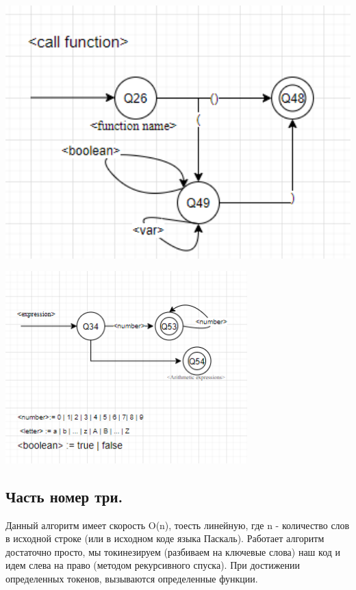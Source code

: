 \documentclass[12pt]{article}
\begin{document}
\includegraphics[width=1\textwidth]{assets/Вызов Функции.png}

\includegraphics[width=0.7\textwidth]{assets/В конце.png}

\begin{center}
    \chapter{\textbf{\Large{Часть номер три.}}}    
\end{center}

\begin{flushleft}
Данный алгоритм имеет скорость O(n), тоесть линейную, где n - количество слов в исходной строке (или в исходном коде языка Паскаль). Работает алгоритм достаточно просто, мы токинезируем (разбиваем на ключевые слова) наш код и идем слева на право (методом рекурсивного спуска). При достижении определенных токенов, вызываются определенные функции. 
\end{flushleft}
\end{document}
